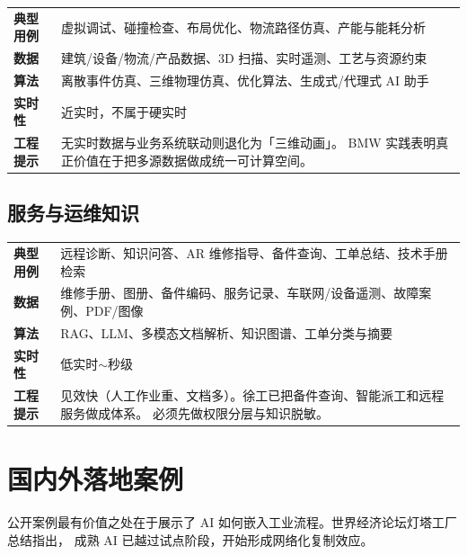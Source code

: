 \documentclass[a4paper,12pt]{ctexart}
\begin{document}
\begin{tabular}{@{}>{\bfseries}lp{11cm}@{}}
典型用例 & 虚拟调试、碰撞检查、布局优化、物流路径仿真、产能与能耗分析 \\
数据 & 建筑/设备/物流/产品数据、3D 扫描、实时遥测、工艺与资源约束 \\
算法 & 离散事件仿真、三维物理仿真、优化算法、生成式/代理式 AI 助手 \\
实时性 & 近实时，不属于硬实时 \\
工程提示 & 无实时数据与业务系统联动则退化为「三维动画」。
BMW 实践表明真正价值在于把多源数据做成统一可计算空间。
\end{tabular}

\subsection{服务与运维知识}

\begin{tabular}{@{}>{\bfseries}lp{11cm}@{}}
典型用例 & 远程诊断、知识问答、AR 维修指导、备件查询、工单总结、技术手册检索 \\
数据 & 维修手册、图册、备件编码、服务记录、车联网/设备遥测、故障案例、PDF/图像 \\
算法 & RAG、LLM、多模态文档解析、知识图谱、工单分类与摘要 \\
实时性 & 低实时$\sim$秒级 \\
工程提示 & 见效快（人工作业重、文档多）。徐工已把备件查询、智能派工和远程服务做成体系。
必须先做权限分层与知识脱敏。
\end{tabular}

\section{国内外落地案例}

公开案例最有价值之处在于展示了 AI 如何嵌入工业流程。世界经济论坛灯塔工厂总结指出，
成熟 AI 已越过试点阶段，开始形成网络化复制效应。
\end{document}
